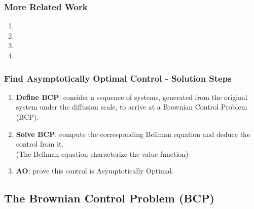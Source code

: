 \documentclass{beamer}
\newcommand{\la}{\lambda}
\begin{document}
\begin{frame}
  \frametitle{More Related Work}

  \begin{enumerate}
  \item {}
  \item {}
  \item {}
  \item {} 
  \end{enumerate}
\end{frame}




\begin{frame}
  \frametitle{Find Asymptotically Optimal Control - Solution Steps}
  \vfill
  \begin{enumerate}[<+->]%
  \item {\bf Define BCP}: consider a sequence of systems, generated from the original system under the diffusion scale, to arrive at a Brownian Control Problem (BCP).
	\vfill  
  \item {\bf Solve BCP}: compute the corresponding Bellman equation and deduce the control from it.\\
{\small (The Bellman equation characterize the value function)}	
	\vfill  
  \item {\bf AO}: prove this control is Asymptotically Optimal. 
  \end{enumerate}
  \vfill
\end{frame}



\subsection{The Brownian Control Problem (BCP)}
\end{document}
